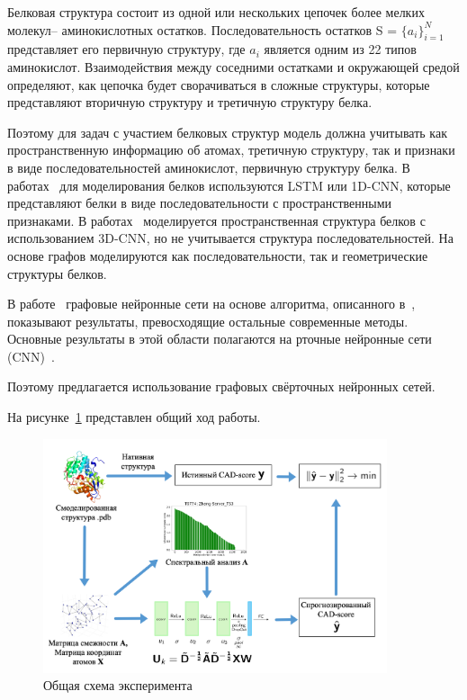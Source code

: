 \documentclass[14pt]{extarticle}
\begin{document}
Белковая структура состоит из одной или нескольких цепочек более мелких молекул-- аминокислотных остатков. Последовательность остатков S = $\{a_i\}_{i=1}^N$ представляет его первичную структуру, где $a_i$ является одним из 22 типов аминокислот. Взаимодействия между соседними остатками и окружающей средой определяют, как цепочка будет сворачиваться в сложные структуры, которые представляют вторичную структуру и третичную структуру белка.

Поэтому для задач с участием белковых структур модель должна учитывать как пространственную информацию об атомах, третичную структуру, так и признаки в виде последовательностей аминокислот, первичную структуру белка.  В работах~\cite{HurtadoQA, AngularQA} для моделирования белков используются LSTM или 1D-CNN, которые представляют белки в виде последовательности с пространственными признаками.  В работах~\cite{3DCNN, 10.1093/bioinformatics/btz122} моделируется пространственная структура белков с использованием 3D-CNN, но не учитывается структура последовательностей. На основе графов моделируются как последовательности, так и геометрические структуры белков. 

В работе~\cite{Baldassarre2019GraphQAPM} графовые нейронные сети на основе алгоритма, описанного в~\cite{Battaglia2018RelationalIB}, показывают результаты, превосходящие остальные современные методы. Основные результаты в этой области полагаются на рточные нейронные сети (CNN)~\cite{10.1093/bioinformatics/btz122}. 

Поэтому предлагается использование графовых свёрточных нейронных сетей. 

На рисунке~\ref{fig:experiment} представлен общий ход работы.

\begin{figure}[h]
	\centering
	\includegraphics[width=0.9\textwidth]{main_slide.pdf}
	\caption{Общая схема эксперимента}
	\label{fig:experiment}
\end{figure}
\end{document}
